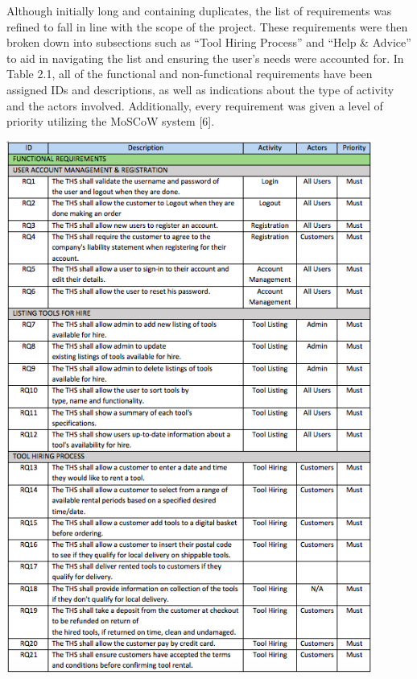 \documentclass[fontsize=11pt]{extarticle}
\numberwithin{figure}{section} %
\numberwithin{table}{section}%
\begin{document}
Although initially long and containing duplicates, the list of
requirements was refined to fall in line with the scope of the project.
These requirements were then broken down into subsections such as ``Tool
Hiring Process'' and ``Help \& Advice'' to aid in navigating the list
and ensuring the user's needs were accounted for. In Table 2.1, all of
the functional and non-functional requirements have been assigned IDs
and descriptions, as well as indications about the type of activity and
the actors involved. Additionally, every requirement was given a level
of priority utilizing the MoSCoW system {[}6{]}.

\begin{table}[H]
      \centering
      \includegraphics[trim = 0 0 0 0, clip, width=0.9\textwidth]{TempImg/req1.png}
 \end{table}
\end{document}

